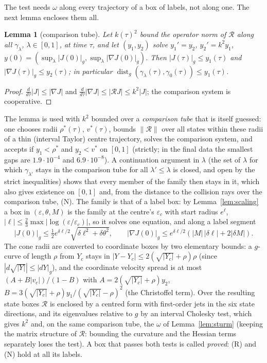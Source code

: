 \documentclass[11pt]{article}
\newtheorem{lemma}[theorem]{Lemma}
\theoremstyle{definition}
\begin{document}
The test needs $\omega$ along every trajectory of a box of labels, not along one. The next lemma encloses them all.

\begin{lemma}[comparison tube]\label{lem:comp}
Let $k(\tau)^2$ bound the operator norm of $\mathcal R$ along all $\gamma_\lambda$, $\lambda\in[0,1]$, at time $\tau$,
and let $(y_1,y_2)$ solve $y_1'=y_2$, $y_2'=k^2y_1$, $y(0)=(\sup_\lambda|J(0)|_g,\sup_\lambda|\nabla J(0)|_g)$. Then
$|J(\tau)|_g\le y_1(\tau)$ and $|\nabla J(\tau)|_g\le y_2(\tau)$; in particular
$\operatorname{dist}_g(\gamma_\lambda(\tau),\gamma_0(\tau))\le y_1(\tau)$.
\end{lemma}
\begin{proof}
$\frac{d}{d\tau}|J|\le|\nabla J|$ and $\frac{d}{d\tau}|\nabla J|\le|\mathcal RJ|\le k^2|J|$; the comparison system is
cooperative.
\end{proof}
The lemma is used with $k^2$ bounded over a \emph{comparison tube} that is itself guessed: one chooses radii
$\rho^*(\tau)$, $v^*(\tau)$, bounds $\|\mathcal R\|$ over all states within these radii of a thin (interval Taylor)
centre trajectory, solves the comparison system, and accepts if $y_1<\rho^*$ and $y_2<v^*$ on $[0,1]$ (strictly; in
the final data the smallest gaps are $1.9\cdot10^{-4}$ and $6.9\cdot10^{-8}$). A continuation argument in $\lambda$ (the
set of $\lambda$ for which $\gamma_{\lambda'}$ stays in the comparison tube for all $\lambda'\le\lambda$ is closed, and
open by the strict inequalities) shows that every member of the family then stays in it, which also gives existence on
$[0,1]$ and, from the distance to the collision rays over the comparison tube, (N). The family is that of a label box:
by Lemma~\ref{lem:scaling} a box in $(\varepsilon,\theta,M)$ is the family at the centre's $\varepsilon_c$ with start
radius $e^{\ell}$, $|\ell|\le\tfrac23\max|\log(\varepsilon/\varepsilon_c)|$, so it solves one equation, and along a
label segment
\[
|J(0)|_g\le\tfrac12e^{\delta\ell/2}\sqrt{\delta\ell^2+\delta\theta^2},\qquad
|\nabla J(0)|_g\le e^{\delta\ell/2}(|M|\,|\delta\ell|+2|\delta M|).
\]
The cone radii are converted to coordinate boxes by two elementary bounds: a $g$-curve of length $\rho$ from $Y_c$
stays in $|Y-Y_c|\le2(\sqrt{|Y_c|}+\rho)\rho$ (since $|d\sqrt{|Y|}|\le|dY|_g$), and the coordinate velocity spread is at
most $(A+B|v_c|)/(1-B)$ with $A=2(\sqrt{|Y_c|}+\rho)y_2$, $B=3(\sqrt{|Y_c|}+\rho)y_1/(\sqrt{|Y_c|}-\rho)^2$ (the Christoffel
term). Over the resulting state boxes $\mathcal R$ is enclosed by a centred form with first-order jets in the six state
directions, and its eigenvalues relative to $g$ by an interval Cholesky test, which gives $k^2$ and, on the same comparison tube, the $\omega$ of Lemma~\ref{lem:sturm} (keeping the
matrix structure of $\mathcal R$: bounding the curvature and the Hessian terms separately loses the test). A box that
passes both tests is called \emph{proved}: (R) and (N) hold at all its labels.
\end{document}
